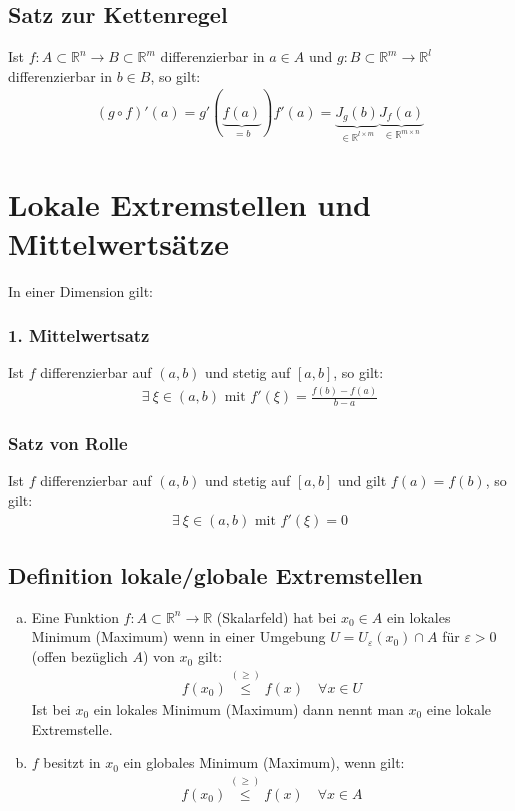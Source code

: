 \documentclass[11pt,a4paper]{book}
\newcommand {\R}	{\mathbb{R}}
\newcommand {\Rn}	{\mathbb{R}^n}
\newcommand {\Rm}	{\mathbb{R}^m}
\newcommand{\1}    	{\mathbbm{1}}
\newcommand{\mitt}	{\textrm{ mit }}
\begin{document}
\subsection{Satz zur Kettenregel}
Ist \(f: A \subset \Rn \rightarrow B \subset \Rm\) differenzierbar in \(a \in A\) und \(g: B \subset \Rm \rightarrow \R^l\) differenzierbar in \(b \in B\), so gilt:
\begin{align*}
	(g \circ f)'(a) = g'\left(\underbrace{f(a)}_{=b}\right) f'(a) = 
	\underbrace{ J_g (b) }_{\in \R^{l \times m}}
	\underbrace{ J_f (a) }_{\in \R^{m \times n}}
\end{align*}

\section{Lokale Extremstellen und Mittelwertsätze}

In einer Dimension gilt:
\subsubsection*{1. Mittelwertsatz}
Ist \(f\) differenzierbar auf \((a,b)\) und stetig auf \([a,b]\), so gilt:
\begin{align*}
	\exists~ \xi \in (a,b) \mitt f'(\xi) = \frac{f(b) - f(a)}{b - a}
\end{align*}

\subsubsection*{Satz von Rolle}
Ist \(f\) differenzierbar auf \((a,b)\) und stetig auf \([a,b]\) und gilt \(f(a) = f(b)\), so gilt:
\begin{align*}
	\exists~ \xi \in (a,b) \mitt f'(\xi) = 0
\end{align*}

\subsection{Definition lokale/globale Extremstellen}
\begin{enumerate}[a.~]
	\item Eine Funktion \(f: A \subset \Rn \rightarrow \R \) (Skalarfeld) hat bei \(x_0 \in A\) ein lokales Minimum (Maximum) wenn in einer Umgebung \(U = U_\varepsilon (x_0) \cap A\) für \( \varepsilon > 0\) (offen bezüglich \(A\)) von \(x_0\) gilt:
	\begin{align*}
		f(x_0) \stackrel{(\geqslant)}{\leqslant} f(x) \quad \forall x \in U
	\end{align*}	 
	Ist bei \(x_0\) ein lokales Minimum (Maximum) dann nennt man \(x_0\) eine lokale Extremstelle. 
	\item \(f\) besitzt in \(x_0\) ein globales Minimum (Maximum), wenn gilt:
	\begin{align*}
		f(x_0) \stackrel{(\geqslant)}{\leqslant} f(x) \quad \forall x \in A
	\end{align*}
\end{enumerate}
\end{document}
